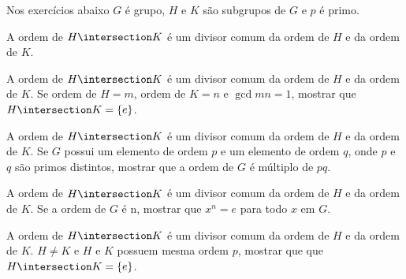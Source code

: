 Nos exercícios abaixo $G$ é grupo, $H$ e $K$ são subgrupos de $G$ e $p$ é primo.

\begin{exercise}
    A ordem de $H \intersection K$ é um divisor comum da ordem de $H$ e da ordem de $K$.
\end{exercise}

\begin{exercise}
    A ordem de $H \intersection K$ é um divisor comum da ordem de $H$ e da ordem de $K$.
    Se ordem de $H = m$, ordem de $K = n$ e $\gcd m n = 1$, mostrar que $H \intersection K = \{e\}$.
\end{exercise}

\begin{exercise}
    A ordem de $H \intersection K$ é um divisor comum da ordem de $H$ e da ordem de $K$.
   Se $G$ possui um elemento de ordem $p$ e um elemento de ordem $q$, onde $p$ e $q$ são primos distintos, mostrar que a ordem de $G$ é múltiplo de $pq$.
\end{exercise}

\begin{exercise}
    A ordem de $H \intersection K$ é um divisor comum da ordem de $H$ e da ordem de $K$.
    Se a ordem de $G$ é n, mostrar que $x^n = e$ para todo $x$ em $G$.
\end{exercise}

\begin{exercise}
    A ordem de $H \intersection K$ é um divisor comum da ordem de $H$ e da ordem de $K$.
    $H \neq K$ e $H$ e $K$ possuem mesma ordem $p$, mostrar que que $H \intersection K = \{e\}$.
\end{exercise}
